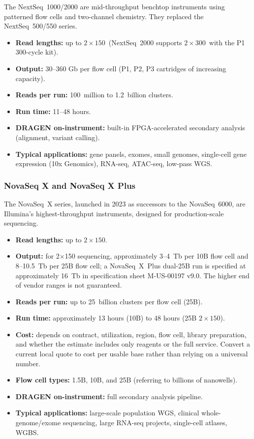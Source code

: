 The NextSeq~1000/2000 are mid-throughput benchtop instruments using patterned flow cells and two-channel chemistry. They replaced the NextSeq~500/550 series.

\begin{itemize}[nosep]
  \item \textbf{Read lengths:} up to $2 \times 150$\basepair\ (NextSeq~2000 supports $2 \times 300$\basepair\ with the P1 300-cycle kit).
  \item \textbf{Output:} 30--360 Gb per flow cell (P1, P2, P3 cartridges of increasing capacity).
  \item \textbf{Reads per run:} 100~million to 1.2~billion clusters.
  \item \textbf{Run time:} 11--48 hours.
  \item \textbf{DRAGEN on-instrument:} built-in FPGA-accelerated secondary analysis (alignment, variant calling).
  \item \textbf{Typical applications:} gene panels, exomes, small genomes, single-cell gene expression (10x Genomics), \gls{RNA-seq}, \gls{ATAC-seq}, low-pass \gls{WGS}.
\end{itemize}

\subsubsection{NovaSeq X and NovaSeq X Plus}

The NovaSeq~X series, launched in 2023 as successors to the NovaSeq~6000, are Illumina's highest-throughput instruments, designed for production-scale sequencing.

\begin{itemize}[nosep]
  \item \textbf{Read lengths:} up to $2 \times 150$\basepair.
  \item \textbf{Output:} for 2$\times$150\basepair{} sequencing, approximately 3--4~Tb per 10B flow cell and 8--10.5~Tb per 25B flow cell; a NovaSeq~X~Plus dual-25B run is specified at approximately 16~Tb in specification sheet M-US-00197 v9.0. The higher end of vendor ranges is not guaranteed.
  \item \textbf{Reads per run:} up to 25~billion clusters per flow cell (25B).
  \item \textbf{Run time:} approximately 13 hours (10B) to 48 hours (25B $2 \times 150$\basepair).
  \item \textbf{Cost:} depends on contract, utilization, region, flow cell, library preparation, and whether the estimate includes only reagents or the full service. Convert a current local quote to cost per usable base rather than relying on a universal number.
  \item \textbf{Flow cell types:} 1.5B, 10B, and 25B (referring to billions of nanowells).
  \item \textbf{DRAGEN on-instrument:} full secondary analysis pipeline.
  \item \textbf{Typical applications:} large-scale population \gls{WGS}, clinical whole-genome/exome sequencing, large \gls{RNA-seq} projects, single-cell atlases, \gls{WGBS}.
\end{itemize}

